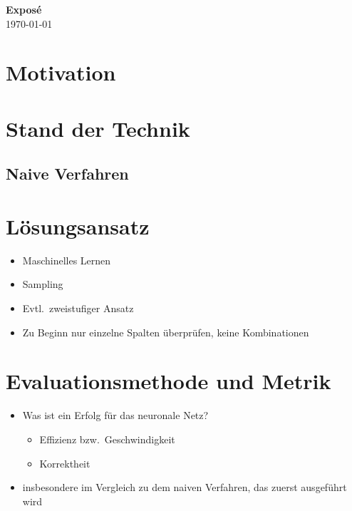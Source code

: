 \documentclass[a4paper]{article}
\begin{document}
\reversemarginpar{}
\thispagestyle{firstpagestyle}
\begin{center}
  \huge \textbf{Exposé}\\[8pt]
  \normalsize \today
\end{center}

\section{Motivation}

\section{Stand der Technik}

\subsection{Naive Verfahren}

\section{Lösungsansatz}
\begin{itemize}
  \item Maschinelles Lernen
  \item Sampling
  \item Evtl.\ zweistufiger Ansatz
  \item Zu Beginn nur einzelne Spalten überprüfen, keine Kombinationen
\end{itemize}

\section{Evaluationsmethode und Metrik}
\begin{itemize}
  \item Was ist ein Erfolg für das neuronale Netz?
        \begin{itemize}[label=\(\rightarrow \)]
          \item Effizienz bzw.\ Geschwindigkeit
          \item Korrektheit
        \end{itemize}
  \item insbesondere im Vergleich zu dem naiven Verfahren, das zuerst ausgeführt wird
\end{itemize}
\end{document}
